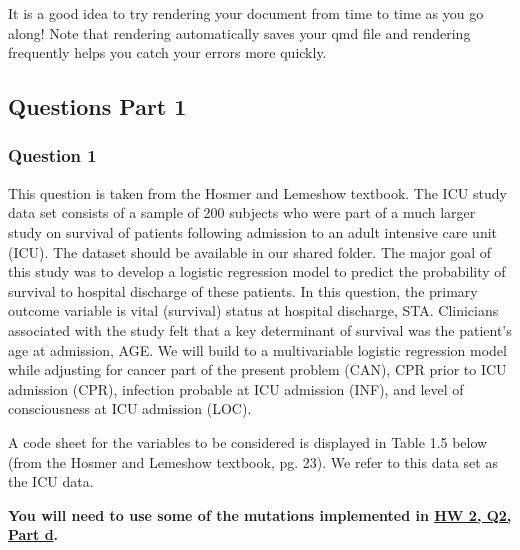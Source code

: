 \documentclass[
  letterpaper,
  DIV=11,
  numbers=noendperiod]{scrartcl}
\begin{document}
\begin{tcolorbox}[enhanced jigsaw, titlerule=0mm, toprule=.15mm, colframe=quarto-callout-tip-color-frame, leftrule=.75mm, title=\textcolor{quarto-callout-tip-color}{\faLightbulb}\hspace{0.5em}{Tip}, colbacktitle=quarto-callout-tip-color!10!white, rightrule=.15mm, toptitle=1mm, colback=white, bottomtitle=1mm, arc=.35mm, breakable, coltitle=black, bottomrule=.15mm, opacitybacktitle=0.6, opacityback=0, left=2mm]

It is a good idea to try rendering your document from time to time as
you go along! Note that rendering automatically saves your qmd file and
rendering frequently helps you catch your errors more quickly.

\end{tcolorbox}

\subsection{Questions Part 1}\label{questions-part-1}

\subsubsection{Question 1}\label{question-1}

This question is taken from the Hosmer and Lemeshow textbook. The ICU
study data set consists of a sample of 200 subjects who were part of a
much larger study on survival of patients following admission to an
adult intensive care unit (ICU). The dataset should be available in our
shared folder. The major goal of this study was to develop a logistic
regression model to predict the probability of survival to hospital
discharge of these patients. In this question, the primary outcome
variable is vital (survival) status at hospital discharge, STA.
Clinicians associated with the study felt that a key determinant of
survival was the patient's age at admission, AGE. We will build to a
multivariable logistic regression model while adjusting for cancer part
of the present problem (CAN), CPR prior to ICU admission (CPR),
infection probable at ICU admission (INF), and level of consciousness at
ICU admission (LOC).

A code sheet for the variables to be considered is displayed in Table
1.5 below (from the Hosmer and Lemeshow textbook, pg. 23). We refer to
this data set as the ICU data.

\textbf{You will need to use some of the mutations implemented in
\href{https://nwakim.github.io/BSTA_513_S25/homework/HW_02.html\#part-d-1}{HW
2, Q2, Part d}.}
\end{document}
